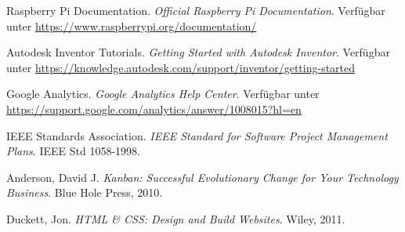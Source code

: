 \begin{thebibliography}{9}
    Raspberry Pi Documentation.
    \textit{Official Raspberry Pi Documentation}.
    Verfügbar unter \url{https://www.raspberrypi.org/documentation/}
    
    Autodesk Inventor Tutorials.
    \textit{Getting Started with Autodesk Inventor}.
    Verfügbar unter \url{https://knowledge.autodesk.com/support/inventor/getting-started}
    
    Google Analytics.
    \textit{Google Analytics Help Center}.
    Verfügbar unter \url{https://support.google.com/analytics/answer/1008015?hl=en}
    
    IEEE Standards Association.
    \textit{IEEE Standard for Software Project Management Plans}.
    IEEE Std 1058-1998.
    
    Anderson, David J.
    \textit{Kanban: Successful Evolutionary Change for Your Technology Business}.
    Blue Hole Press, 2010.
    
    Duckett, Jon.
    \textit{HTML \& CSS: Design and Build Websites}.
    Wiley, 2011.
    
    \end{thebibliography}
    